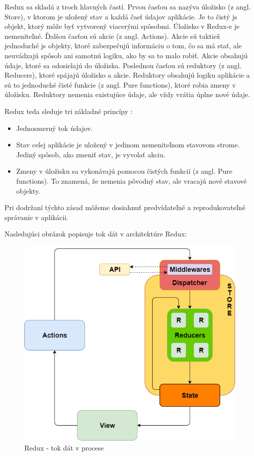 Redux sa skladá z troch hlavných častí.
Prvou časťou sa nazýva úložisko (z angl. Store), v ktorom je
uložený stav a každá časť údajov aplikácie. Je to čistý \acrshort{js} objekt,
ktorý môže byť vytvorený viacerými spôsobmi. Úložisko v Redux-e je nemeniteľné. 
Ďalšou časťou sú akcie (z angl. Actions). Akcie sú taktiež jednoduché \acrshort{js} objekty, ktoré
zabezpečujú informáciu o tom, čo sa má stať, ale neuvádzajú spôsob ani samotnú
logiku, ako by sa to malo robiť. Akcie obsahujú údaje, ktoré sa odosielajú do úložiska.
Poslednou časťou sú reduktory (z angl. Reducers), ktoré spájajú úložisko a akcie.
Reduktory obsahujú logiku aplikácie a sú to jednoduché čisté funkcie (z angl. Pure functions), ktoré
robia zmeny v úložisku. Reduktory nemenia existujúce údaje, ale vždy vrátia úplne nové údaje.

Redux teda sleduje tri základné princípy \cite{redux}:
\begin{itemize}
\item Jednosmerný tok údajov.
\item Stav celej aplikácie je uložený v jedinom nemeniteľnom stavovom strome.
Jediný spôsob, ako zmeniť stav, je vyvolať akciu.
\item Zmeny v úložisku sa vykonávajú pomocou čistých funkcií (z angl. Pure functions).
To znamená, že nemenia pôvodný stav, ale vracajú nové stavové objekty.
\end{itemize}

Pri dodržaní týchto zásad môžeme dosiahnuť predvídateľné a reprodukovateľné
správanie v aplikácii.

Nasledujúci obrázok popisuje tok dát v architektúre Redux:
\begin{figure}[ht]
  \centering
  \includegraphics[width=0.8\columnwidth]{img/redux_flow.png}
  \caption{\label{fig:redux_flow} Redux - tok dát v procese \cite{ngredux}}
\end{figure}
\newpage


